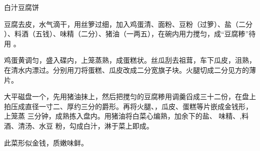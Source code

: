 \begin{recipe}[金钱豆腐]{白汁豆腐饼}

\ingredients


\cooking

\step 豆腐去皮，水气滴干，用丝箩过细，加入鸡蛋清、面粉、豆粉（过箩）、盐（二分
）、料酒（五钱）、味精（二分）、猪油（一两五），在碗内用力搅匀，成“豆腐糁”待用
。

\step 鸡蛋黄调匀，盛入碟内，上笼蒸熟，成蛋糕状。丝瓜刮去祖茸，车下瓜皮，沮熟，
在清水内漂过。分别用刀将蛋糕、瓜皮改成二分宽旗子块。火腿切成二分见方的薄片。

\step 大平磁盘一个，先用猪油抹上，然后把搅匀的豆腐糁用调羹舀成三十二份，在盘上
拍压成直径一寸二、厚约三分的爵形。再将火腿、，瓜皮、蛋糕等片嵌成金钱形，上笼蒸
三分钟，成熟拣入盘内。用猪油将白菜心煸熟，加余下的盐、 味精、,料酒、清汤、水豆
粉，勾成白汁，淋于菜上即成。

\notes

此菜形似金钱，质嫩味鲜。

\end{recipe}

